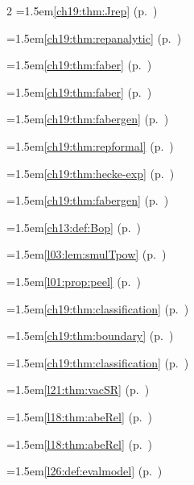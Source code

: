\begin{multicols}{2}
\hangindent=1.5em\quad \ref{ch19:thm:Jrep} (p.~\pageref{ch19:thm:Jrep})\par
\hangindent=1.5em\quad \ref{ch19:thm:repanalytic} (p.~\pageref{ch19:thm:repanalytic})\par
\hangindent=1.5em\quad \ref{ch19:thm:faber} (p.~\pageref{ch19:thm:faber})\par
\hangindent=1.5em\quad \ref{ch19:thm:faber} (p.~\pageref{ch19:thm:faber})\par
\hangindent=1.5em\quad \ref{ch19:thm:fabergen} (p.~\pageref{ch19:thm:fabergen})\par
\hangindent=1.5em\quad \ref{ch19:thm:repformal} (p.~\pageref{ch19:thm:repformal})\par
\hangindent=1.5em\quad \ref{ch19:thm:hecke-exp} (p.~\pageref{ch19:thm:hecke-exp})\par
\hangindent=1.5em\quad \ref{ch19:thm:fabergen} (p.~\pageref{ch19:thm:fabergen})\par
\hangindent=1.5em\quad \ref{ch13:def:Bop} (p.~\pageref{ch13:def:Bop})\par
\hangindent=1.5em\quad \ref{l03:lem:smulTpow} (p.~\pageref{l03:lem:smulTpow})\par
\hangindent=1.5em\quad \ref{l01:prop:peel} (p.~\pageref{l01:prop:peel})\par
\hangindent=1.5em\quad \ref{ch19:thm:classification} (p.~\pageref{ch19:thm:classification})\par
\hangindent=1.5em\quad \ref{ch19:thm:boundary} (p.~\pageref{ch19:thm:boundary})\par
\hangindent=1.5em\quad \ref{ch19:thm:classification} (p.~\pageref{ch19:thm:classification})\par
\hangindent=1.5em\quad \ref{l21:thm:vacSR} (p.~\pageref{l21:thm:vacSR})\par
\hangindent=1.5em\quad \ref{l18:thm:abeRel} (p.~\pageref{l18:thm:abeRel})\par
\hangindent=1.5em\quad \ref{l18:thm:abeRel} (p.~\pageref{l18:thm:abeRel})\par
\hangindent=1.5em\quad \ref{l26:def:evalmodel} (p.~\pageref{l26:def:evalmodel})\par

\end{multicols}
